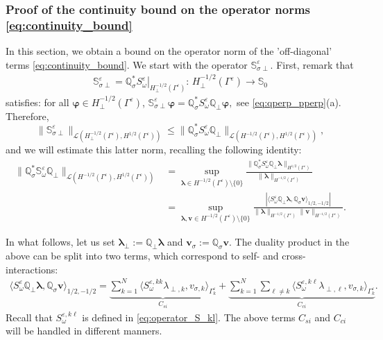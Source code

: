 \documentclass[]{article}
\numberwithin{equation}{section}
\numberwithin{theorem}{section}
\numberwithin{lemma}{section}
\numberwithin{corollary}{section}
\numberwithin{proposition}{section}
\numberwithin{definition}{section}
\newcommand{\re}{\varepsilon}
\renewcommand{\vec}{\boldsymbol}
\begin{document}
	\subsubsection{Proof of the continuity bound on the operator norms \eqref{eq:continuity_bound}}
	\label{sec:continuity_bound} 
	In this section, we obtain a bound on the operator norm of the 'off-diagonal' terms \eqref{eq:continuity_bound}. We start with the operator $\mathbb{S}_{\sigma\perp}^{\re}$. First, remark that
	\begin{align*}%
		\mathbb{S}_{\sigma\perp}^{\re}=\mathbb{Q}_{\sigma}^*\left.S^{\re}_{\omega}\right|_{H^{-1/2}_{\perp}(\Gamma^{\re})}:\, H^{-1/2}_{\perp}(\Gamma^{\re})\rightarrow \mathbb{S}_0
	\end{align*}
	satisfies: for all $\vec{\varphi}\in H^{-1/2}_{\perp}(\Gamma^{\re})$, $
	\mathbb{S}_{\sigma\perp}^{\re}\vec{\varphi}=\mathbb{Q}_{\sigma}^* S^{\re}_{\omega}\mathbb{Q}_{\perp}\vec{\varphi},$ 
	see \eqref{eq:qperp_pperp}(a). Therefore, $$
	\|\mathbb{S}_{\sigma\perp}^{\re}\|_{\mathcal{L}(H^{-1/2}_{\perp}(\Gamma^{\re}), H^{1/2}(\Gamma^{\re}))}\leq \|\mathbb{Q}_{\sigma}^* S^{\re}_{\omega}\mathbb{Q}_{\perp}\|_{\mathcal{L}(H^{-1/2}(\Gamma^{\re}), H^{1/2}(\Gamma^{\re}))},$$
	and we will estimate this latter norm, recalling the following identity:
	\begin{align}
		\label{eq:split0}
		\| \mathbb{Q}_{\sigma}^*\mathbb{S}^{\re}_{\omega}\mathbb{Q}_{\perp} \|_{\mathcal{L}( H^{-1/2}(\Gamma^{\re}), H^{1/2}(\Gamma^{\re}))} &= \sup_{\vec{\lambda}  \in H^{-1/2}(\Gamma^{\re}) \setminus \{0\}} \frac{\| \mathbb{Q}^*_{\sigma} S^{\re}_{\omega} \mathbb{Q}_{\perp} \vec{\lambda} \|_{H^{1/2}(\Gamma^{\re})}}{\| \vec{\lambda} \|_{H^{-1/2}(\Gamma^{\re})}} \nonumber \\
		&= \sup_{\vec{\lambda}, \vec{v}  \in H^{-1/2}(\Gamma^{\re}) \setminus \{0\}} \frac{|\langle  S^{\re}_{\omega} \mathbb{Q}_{\perp}\vec{\lambda}, \mathbb{Q}_{\sigma}\vec{v}\rangle_{1/2, -1/2}|}{\| \vec{\lambda} \|_{H^{-1/2}(\Gamma^{\re})} \| \vec{v} \|_{H^{-1/2}(\Gamma^{\re})}}. 
	\end{align}
	
	In what follows, let us set $\vec{\lambda}_{\perp}:=\mathbb{Q}_{\perp}\vec{\lambda}$ and $\vec{v}_{\sigma}:=\mathbb{Q}_{\sigma}\vec{v}$. 
	The duality product in the above can be split into two terms, which correspond to  self- and cross-interactions:
	\begin{align}
		\label{eq:split}
		\langle  S^{\re}_{\omega} \mathbb{Q}_{\perp}\vec{\lambda}, \mathbb{Q}_{\sigma}\vec{v}\rangle_{1/2, -1/2}=\underbrace{\sum\limits_{k=1}^N\langle S^{\re,kk}_{\omega}\lambda_{\perp,k}, v_{\sigma,k}\rangle_{\Gamma^{\re}_k}}_{C_{si}}+\underbrace{\sum\limits_{k=1}^N\sum\limits_{\ell\neq k}\langle S^{\re,k\ell}_{\omega}\lambda_{\perp,\ell}, v_{\sigma,k}\rangle_{\Gamma^{\re}_k}}_{C_{ci}}.
	\end{align}
	Recall that $S_{\omega}^{\re,k\ell}$ is defined in \eqref{eq:operator_S_kl}. The above terms $C_{si}$ and $C_{ci}$ will be handled in different manners. 	
	
\end{document}
